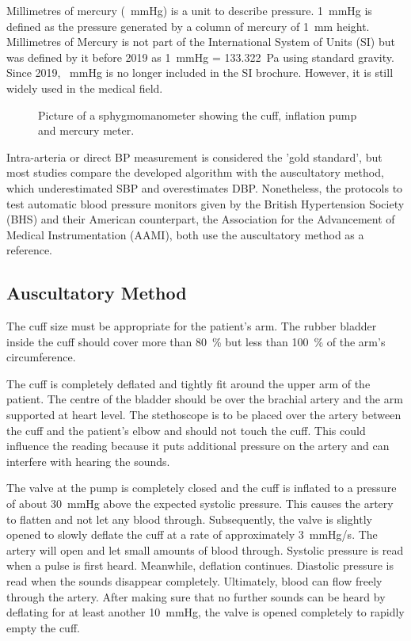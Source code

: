 Millimetres of mercury (\SI{}{\mmHg}) is a unit to describe pressure. \SI{1}{\mmHg} is defined as the pressure generated by a column of mercury of \SI{1}{\mm} height. Millimetres of Mercury is not part of the International System of Units (SI) but was defined by it before 2019 as \SI{1}{\mmHg} = \SI{133.322}{\Pa} using standard gravity.\cite{SI2006} Since 2019, \SI{}{\mmHg} is no longer included in the SI brochure. However, it is still widely used in the medical field. \cite{Prazak2020}

\begin{figure}[h]
\centering
\caption{Picture of a sphygmomanometer showing the cuff, inflation pump and mercury meter.}
\label{fig:sphy}
\end{figure}

Intra-arteria or direct BP measurement is considered the 'gold standard', but most studies compare the developed algorithm with the auscultatory method, which underestimated SBP and overestimates DBP. \cite{Sapinski1996} Nonetheless, the protocols to test automatic blood pressure monitors given by the British Hypertension Society (BHS) and their American counterpart, the Association for the Advancement of Medical Instrumentation (AAMI), both use the auscultatory method as a reference. \cite{Jazbinsek2010,OBrien1993,AAMI2013}

\subsection{Auscultatory Method}
The cuff size must be appropriate for the patient's arm. The rubber bladder inside the cuff should cover more than \SI{80}{\%} but less than \SI{100}{\%} of the arm's circumference.

The cuff is completely deflated and tightly fit around the upper arm of the patient. The centre of the bladder should be over the brachial artery and the arm supported at heart level. The stethoscope is to be placed over the artery between the cuff and the patient's elbow and should not touch the cuff. This could influence the reading because it puts additional pressure on the artery and can interfere with hearing the sounds.\cite{Lloyd2018,Reeves1995}

The valve at the pump is completely closed and the cuff is inflated to a pressure of about \SI{30}{\mmHg} above the expected systolic pressure. This causes the artery to flatten and not let any blood through. Subsequently, the valve is slightly opened to slowly deflate the cuff at a rate of approximately \SI{3}{\mmHg/\second}. The artery will open and let small amounts of blood through. Systolic pressure is read when a pulse is first heard. Meanwhile, deflation continues. Diastolic pressure is read when the sounds disappear completely. Ultimately, blood can flow freely through the artery. After making sure that no further sounds can be heard by deflating for at least another \SI{10}{\mmHg}, the valve is opened completely to rapidly empty the cuff.\cite{Lloyd2018,Reeves1995}

